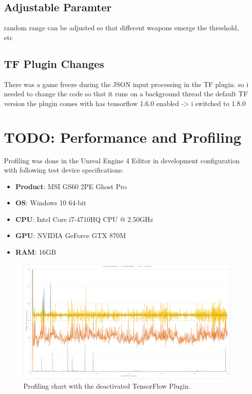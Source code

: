 \documentclass[MGS,Master,english]{twbook}%
\begin{document}
\subsection{Adjustable Paramter}
random range can be adjusted so that different weapons emerge
the threshold, etc

\subsection{\acl{TF} Plugin Changes}
There was a game freeze during the JSON input processing in the TF plugin. so i needed to change the code so that it runs on a background thread
the default TF version the plugin comes with has tensorflow 1.6.0 enabled -> i switched to 1.8.0


\section{TODO: Performance and Profiling}
Profiling was done in the Unreal Engine 4 Editor in development configuration with following test device specifications:
\begin{itemize}
	\item \textbf{Product}: MSI GS60 2PE Ghost Pro
	\item \textbf{OS}: Windows 10 64-bit
	\item \textbf{CPU}: Intel Core i7-4710HQ CPU @ 2.50GHz
	\item \textbf{GPU}: NVIDIA GeForce GTX 870M
	\item \textbf{\ac{RAM}}: 16GB
\end{itemize}

\begin{figure}[!ht]
	\centering
	\includegraphics[width=1.0\linewidth]{PICs/Profiling/deactivated_plugin}
	\caption{Profiling chart with the deactivated TensorFlow Plugin.}
\end{figure}
\end{document}
